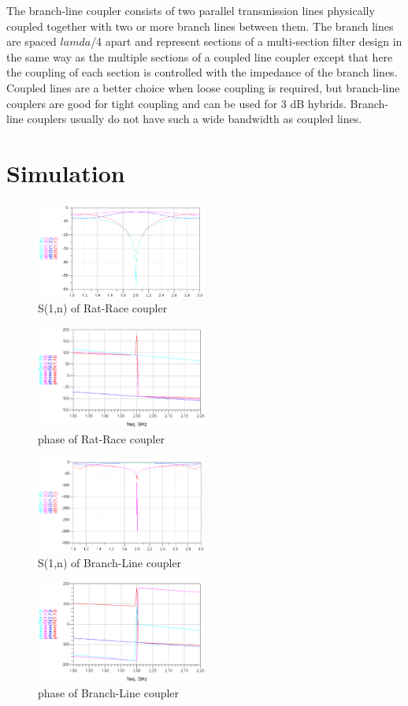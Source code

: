 \documentclass[11pt,a4paper]{report}
\begin{document}
The branch-line coupler consists of two parallel transmission lines physically coupled together with two or more branch lines between them. The branch lines are spaced \(lamda\)/4 apart and represent sections of a multi-section filter design in the same way as the multiple sections of a coupled line coupler except that here the coupling of each section is controlled with the impedance of the branch lines. Coupled lines are a better choice when loose coupling is required, but branch-line couplers are good for tight coupling and can be used for 3 dB hybrids. Branch-line couplers usually do not have such a wide bandwidth as coupled lines. \\

\section*{Simulation}

\begin{figure}
\centering
\includegraphics[width=0.5\textwidth]{2.2.png}
\caption{S(1,n) of Rat-Race coupler}
\end{figure}

\begin{figure}
\centering
\includegraphics[width=0.5\textwidth]{rat-race-phase.eps}
\caption{phase of Rat-Race coupler}
\end{figure}

\begin{figure}
\centering
\includegraphics[width=0.5\textwidth]{2.5.png}
\caption{S(1,n) of Branch-Line coupler}
\end{figure}

\begin{figure}
\centering
\includegraphics[width=0.5\textwidth]{branch-line-phase.eps}
\caption{phase of Branch-Line coupler}
\end{figure}
\end{document}
